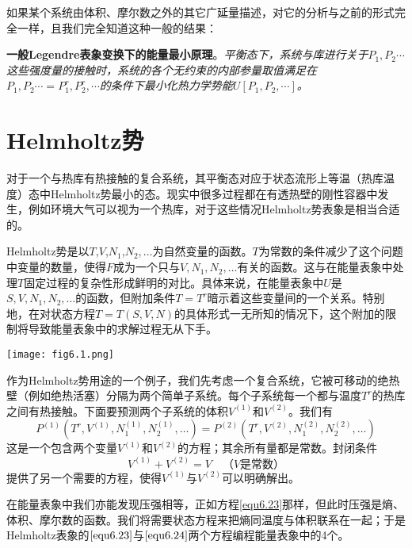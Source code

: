 如果某个系统由体积、摩尔数之外的其它广延量描述，对它的分析与之前的形式完全一样，且我们完全知道这种一般的结果：

{\bf 一般Legendre表象变换下的能量最小原理}。{\it 平衡态下，系统与库进行关于$P_1, P_2\cdots$这些强度量的接触时，系统的各个无约束的内部参量取值满足在$P_1, P_2\cdots=P_1^r, P_2^r, \cdots$的条件下最小化热力学势能$U[P_1, P_2, \cdots]$。}


\section{Helmholtz势}
\label{sec6.2}

对于一个与热库有热接触的复合系统，其平衡态对应于状态流形上等温（热库温度）态中Helmholtz势最小的态。现实中很多过程都在有透热壁的刚性容器中发生，例如环境大气可以视为一个热库，对于这些情况Helmholtz势表象是相当合适的。

Helmholtz势是以$T$,$V$,$N_1$,$N_2, \dots$为自然变量的函数。$T$为常数的条件减少了这个问题中变量的数量，使得$F$成为一个只与$V, N_1, N_2, \dots$有关的函数。这与在能量表象中处理$T$固定过程的复杂性形成鲜明的对比。具体来说，在能量表象中$U$是$S, V, N_1, N_2, \dots$的函数，但附加条件$T = T^r$暗示着这些变量间的一个关系。特别地，在对状态方程$T=T(S, V, N)$的具体形式一无所知的情况下，这个附加的限制将导致能量表象中的求解过程无从下手。

{
    \centering
    \texttt{[image: fig6.1.png]}
}


作为Helmholtz势用途的一个例子，我们先考虑一个复合系统，它被可移动的绝热壁（例如绝热活塞）分隔为两个简单子系统。每个子系统每一个都与温度$T^r$的热库之间有热接触。下面要预测两个子系统的体积$V^{(1)}$和$V^{(2)}$。我们有
\begin{equation}
\label{equ6.23}
	P^{(1)} \left(T^r, V^{(1)}, N_1^{(1)}, N_2^{(1)}, \dots \right) = P^{(2)} \left(T^r, V^{(2)}, N_1^{(2)}, N_2^{(2)}, \dots \right)
\end{equation}
这是一个包含两个变量$V^{(1)}$和$V^{(2)}$的方程；其余所有量都是常数。封闭条件
\begin{equation}
\label{equ6.24}
	V^{(1)} + V^{(2)} = V \quad \text{（$V$是常数）}
\end{equation}
提供了另一个需要的方程，使得$V^{(1)}$与$V^{(2)}$可以明确解出。

在能量表象中我们亦能发现压强相等，正如方程\eqref{equ6.23}那样，但此时压强是熵、体积、摩尔数的函数。我们将需要状态方程来把熵同温度与体积联系在一起；于是Helmholtz表象的$\eqref{equ6.23}$与$\eqref{equ6.24}$两个方程编程能量表象中的4个。

